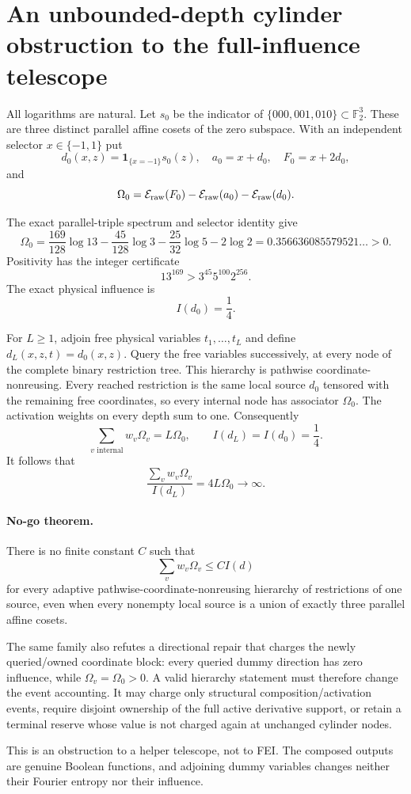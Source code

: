 \section*{An unbounded-depth cylinder obstruction to the full-influence telescope}

All logarithms are natural.  Let $s_0$ be the indicator of
$\{000,001,010\}\subset\mathbb F_2^3$.  These are three distinct parallel
affine cosets of the zero subspace.  With an independent selector
$x\in\{-1,1\}$ put
\[
 d_0(x,z)=\mathbf1_{\{x=-1\}}s_0(z),\quad
 a_0=x+d_0,\quad F_0=x+2d_0,
\]
and
\[
 \Omega_0=\mathcal E_{\rm raw}(F_0)
 -\mathcal E_{\rm raw}(a_0)-\mathcal E_{\rm raw}(d_0).
\]

The exact parallel-triple spectrum and selector identity give
\[
 \Omega_0=
 \frac{169}{128}\log13-\frac{45}{128}\log3
 -\frac{25}{32}\log5-2\log2
 =0.356636085579521\ldots>0.                         \tag{1}
\]
Positivity has the integer certificate
\[
 13^{169}>3^{45}5^{100}2^{256}.                        \tag{2}
\]
The exact physical influence is
\[
 I(d_0)=\frac14.                                       \tag{3}
\]

For $L\ge1$, adjoin free physical variables $t_1,\dots,t_L$ and define
$d_L(x,z,t)=d_0(x,z)$.  Query the free variables successively, at every node
of the complete binary restriction tree.  This hierarchy is pathwise
coordinate-nonreusing.  Every reached restriction is the same local source
$d_0$ tensored with the remaining free coordinates, so every internal node
has associator $\Omega_0$.  The activation weights on every depth sum to one.
Consequently
\[
 \sum_{v\text{ internal}}w_v\Omega_v=L\Omega_0,
 \qquad I(d_L)=I(d_0)=\frac14.                        \tag{4}
\]
It follows that
\[
 \frac{\sum_vw_v\Omega_v}{I(d_L)}=4L\Omega_0
 \longrightarrow\infty.                              \tag{5}
\]

\paragraph{No-go theorem.}
There is no finite constant $C$ such that
\[
 \sum_vw_v\Omega_v\le C I(d)
\]
for every adaptive pathwise-coordinate-nonreusing hierarchy of restrictions
of one source, even when every nonempty local source is a union of exactly
three parallel affine cosets.

The same family also refutes a directional repair that charges the newly
queried/owned coordinate block: every queried dummy direction has zero
influence, while $\Omega_v=\Omega_0>0$.  A valid hierarchy statement must
therefore change the event accounting.  It may charge only structural
composition/activation events, require disjoint ownership of the full active
derivative support, or retain a terminal reserve whose value is not charged
again at unchanged cylinder nodes.

This is an obstruction to a helper telescope, not to FEI.  The composed
outputs are genuine Boolean functions, and adjoining dummy variables changes
neither their Fourier entropy nor their influence.

